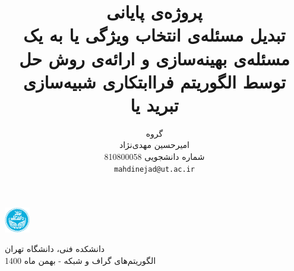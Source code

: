 \documentclass{article}
\title{
پروژه‌ی پایانی\\
تبدیل مسئله‌ی انتخاب ویژگی یا
\lr{Feature selection}
به یک مسئله‌ی بهینه‌سازی و ارائه‌ی روش حل توسط الگوریتم فراابتکاری شبیه‌سازی تبرید یا
\lr{Simulated annealing}
}
\author{%
    گروه \lr{B}\\
  امیرحسین مهدی‌نژاد\\
  شماره دانشجویی 810800058\\
  \texttt{mahdinejad@ut.ac.ir} \\
}
\begin{document}
\begin{minipage}{0.1\textwidth}%
\includegraphics[width=1.1cm]{Photos/UT_logo.png}
\end{minipage}%
\hfill%
\begin{minipage}{0.9\textwidth}\raggedleft
دانشکده فنی، دانشگاه تهران\\
الگوریتم‌های گراف و شبکه - 
بهمن
ماه 1400\\
\end{minipage}


\makepertitle


\end{document}
